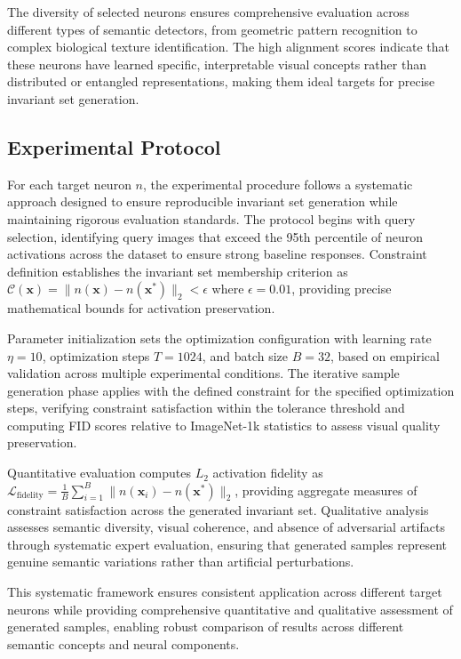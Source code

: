The diversity of selected neurons ensures comprehensive evaluation across different types of semantic detectors, from geometric pattern recognition to complex biological texture identification. The high alignment scores indicate that these neurons have learned specific, interpretable visual concepts rather than distributed or entangled representations, making them ideal targets for precise invariant set generation.

\subsection{Experimental Protocol}

For each target neuron $n$, the experimental procedure follows a systematic approach designed to ensure reproducible invariant set generation while maintaining rigorous evaluation standards. The protocol begins with query selection, identifying query images that exceed the 95th percentile of neuron activations across the dataset to ensure strong baseline responses. Constraint definition establishes the invariant set membership criterion as $\mathcal{C}(\mathbf{x}) = \|n(\mathbf{x}) - n(\mathbf{x^*})\|_2 < \epsilon$ where $\epsilon = 0.01$, providing precise mathematical bounds for activation preservation.

Parameter initialization sets the optimization configuration with learning rate $\eta = 10$, optimization steps $T = 1024$, and batch size $B = 32$, based on empirical validation across multiple experimental conditions. The iterative sample generation phase applies \method{} with the defined constraint for the specified optimization steps, verifying constraint satisfaction within the tolerance threshold and computing FID scores relative to ImageNet-1k statistics to assess visual quality preservation.

Quantitative evaluation computes $L_2$ activation fidelity as $\mathcal{L}_{\text{fidelity}} = \frac{1}{B}\sum_{i=1}^{B}\|n(\mathbf{x}_i) - n(\mathbf{x^*})\|_2$, providing aggregate measures of constraint satisfaction across the generated invariant set. Qualitative analysis assesses semantic diversity, visual coherence, and absence of adversarial artifacts through systematic expert evaluation, ensuring that generated samples represent genuine semantic variations rather than artificial perturbations.

This systematic framework ensures consistent application across different target neurons while providing comprehensive quantitative and qualitative assessment of generated samples, enabling robust comparison of results across different semantic concepts and neural components.

